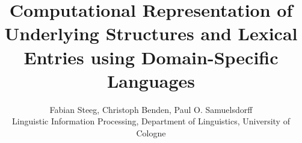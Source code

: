 \documentclass[a4paper, halfparskip, onecolumn, abstracton, final, figurecaptionabove]{scrartcl}
\begin{document}
\titlehead{}
\subject{\normalsize Abstract of a Paper for \emph{Advances in FDG} based on a Poster presented at ICFG12}
\title{\Large Computational Representation of Underlying Structures and Lexical Entries using Domain-Specific Languages}
\author{Fabian Steeg, Christoph Benden, Paul O. Samuelsdorff \\ \small Linguistic Information Processing, Department of Linguistics, University of Cologne}

\maketitle


\marginline{}








\end{document}

